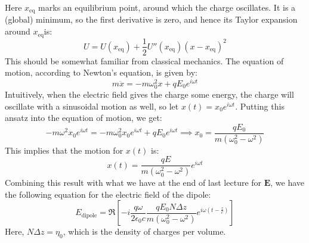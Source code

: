 Here \( x_\text{eq} \) marks an equilibrium point, around which the charge oscillates. It is a (global)
minimum, so the first derivative is zero, and hence its Taylor expansion around \( x_\text{eq} \)is:
\[
	U = U(x_\text{eq}) + \frac{1}{2} U''(x_\text{eq}) (x - x_\text{eq})^2
\]
This should be somewhat familiar from classical mechanics. The equation of motion, according to 
Newton's equation, is given by:
\[
	m \ddot x = - m \omega_0^2 x + q E_0 e^{i \omega t}
\]
Intuitively, when the electric field gives the charge some energy, the charge will oscillate with a
sinusoidal motion as well, so let \( x(t) = x_0 e^{i \omega t} \). Putting this ansatz into the equation of
motion, we get:
\[
	-m \omega^2 x_0 e^{ i \omega t} = - m \omega_0^2 x_0 e^{i \omega t} + q E_0 e^{ i \omega t} \implies x_0
	= \frac{qE_0}{m(\omega_0^2 - \omega^2)}
\]
This implies that the motion for \( x(t) \) is:
\[
	x(t) = \frac{qE }{m(\omega_0^2- \omega^2)}e^{ i \omega t}
\]
Combining this result with what we have at the end of last lecture for
\( \mathbf{E} \), we have the following equation for the electric field of the dipole:
\[
	E_\text{dipole} = \Re\left[ -i \frac{q \omega}{2 \epsilon_0 c} \frac{q E_0 N \Delta z}{m(\omega_0^2 -
	\omega^2)}e^{i \omega\left( t - \frac{z}{c} \right)} \right]
\]
Here, \( N \Delta z = \eta_0 \), which is the density of charges per volume.  

